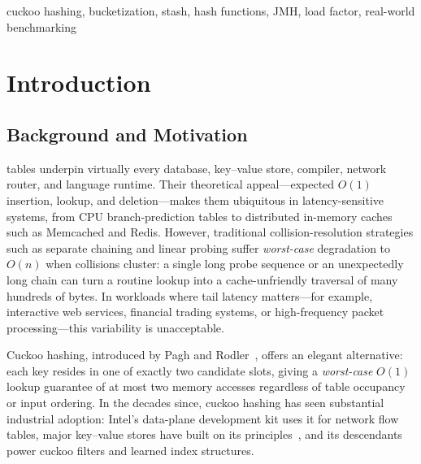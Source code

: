 \documentclass[10pt,journal,compsoc]{IEEEtran}
\begin{document}
{\begin{IEEEkeywords}
cuckoo hashing, bucketization, stash, hash functions, JMH, load factor, real-world benchmarking
\end{IEEEkeywords}

}

\maketitle
\IEEEdisplaynontitleabstractindextext
\IEEEpeerreviewmaketitle

\section{Introduction}

\subsection{Background and Motivation}
 tables underpin virtually every database, key--value store, compiler, network router, and language runtime. Their theoretical appeal---expected $O(1)$ insertion, lookup, and deletion---makes them ubiquitous in latency-sensitive systems, from CPU branch-prediction tables to distributed in-memory caches such as Memcached and Redis. However, traditional collision-resolution strategies such as separate chaining and linear probing suffer \emph{worst-case} degradation to $O(n)$ when collisions cluster: a single long probe sequence or an unexpectedly long chain can turn a routine lookup into a cache-unfriendly traversal of many hundreds of bytes. In workloads where tail latency matters---for example, interactive web services, financial trading systems, or high-frequency packet processing---this variability is unacceptable.

Cuckoo hashing, introduced by Pagh and Rodler~\cite{pagh2004cuckoo}, offers an elegant alternative: each key resides in one of exactly two candidate slots, giving a \emph{worst-case} $O(1)$ lookup guarantee of at most two memory accesses regardless of table occupancy or input ordering. In the decades since, cuckoo hashing has seen substantial industrial adoption: Intel's data-plane development kit uses it for network flow tables, major key--value stores have built on its principles~\cite{fan2013memc3,li2014libcuckoo}, and its descendants power cuckoo filters and learned index structures.
\end{document}
